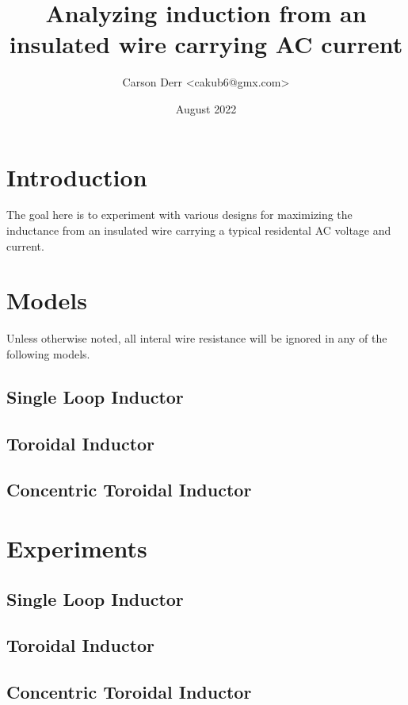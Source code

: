 \documentclass{article}
\title{Analyzing induction from an insulated wire carrying AC current}
\author{Carson Derr <cakub6@gmx.com>}
\date{August 2022}
\begin{document}
\maketitle
\begin{multicols}{2}

\section{Introduction}
The goal here is to experiment with various designs for maximizing the inductance
from an insulated wire carrying a typical residental AC voltage and current.

\section{Models}
Unless otherwise noted, all interal wire resistance will be ignored in any of the following models.

\subsection{Single Loop Inductor}

\subsection{Toroidal Inductor}

\subsection{Concentric Toroidal Inductor}

\section{Experiments}

\subsection{Single Loop Inductor}

\subsection{Toroidal Inductor}

\subsection{Concentric Toroidal Inductor}

\end{multicols}
\end{document}
